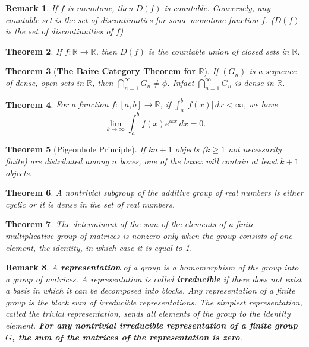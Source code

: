 \documentclass[answers, a4paper, 12pt]{exam}
\newtheorem{theorem}{Theorem}[section]
\newtheorem{remark}[theorem]{Remark}
\newcommand{\R}{\mathbb{R}}
\begin{document}
\begin{remark}
    If $f$ is monotone, then $D(f)$ is countable. Conversely, any countable set is the set of discontinuities for some monotone function $f$. ($D(f)$ is the set of discontinuities of $f$)
\end{remark}

\begin{theorem}
    If $f:\R\to\R$, then $D(f)$ is the countable union of closed sets in $\R$.
\end{theorem}

\begin{theorem}[\textbf{The Baire Category Theorem for $\bm{\R}$}]
    If $(G_n)$ is a sequence of dense, open sets in $\R$, then $\displaystyle\bigcap_{n=1}^{\infty}{G_n}\neq\phi$. Infact $\displaystyle\bigcap_{n=1}^{\infty}{G_n}$ is dense in $\R$.
\end{theorem}

\begin{theorem}
    For a function $f:[a,b]\to\R$, if $\displaystyle\int_{a}^{b}{|f(x)|\,dx}<\infty$, we have
    $$\lim_{k\to\infty}{\int_{a}^{b}{f(x)e^{ikx}\,dx}}=0.$$
\end{theorem}

\begin{theorem}[Pigeonhole Principle]
    If $kn+1$ objects ($k\geq 1$ not necessarily finite) are distributed among $n$ boxes, one of the boxex will contain at least $k+1$ objects.
\end{theorem}

\begin{theorem}
    A nontrivial subgroup of the additive group of real numbers is either cyclic or it is dense in the set of real numbers.
\end{theorem}

\begin{theorem}
    The determinant of the sum of the elements of a finite multiplicative group of matrices is nonzero only when the group consists of one element, the identity, in which case it is equal to 1.
\end{theorem}

\begin{remark}
    A \textbf{representation} of a group is a homomorphism of the group into a group of matrices. A representation is called \textbf{irreducible} if there does not exist a basis in which it can be decomposed into blocks. Any representation of a finite group is the block sum of irreducible representations. The simplest representation, called the trivial representation, sends all elements of the group to the identity element. \textbf{For any nontrivial irreducible representation of a finite group $G$, the sum of the matrices of the representation is zero}.
\end{remark}
\end{document}
